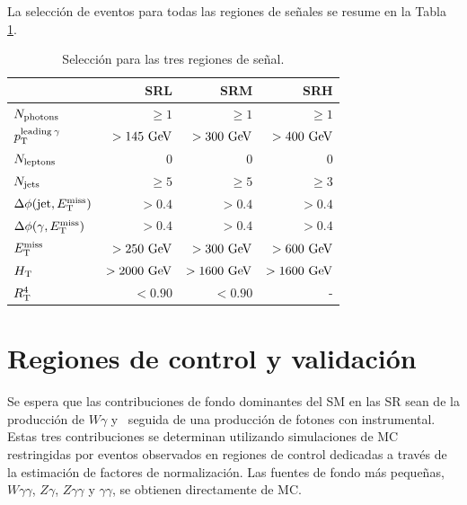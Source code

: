 La selección de eventos para todas las regiones de señales se resume en la Tabla \ref{tab:sr_selection}. 

\begin{table}[ht!]
  \centering
  \begin{tabular}{lrrr}
    \hline
    \hline
                                                    &        SRL    &       SRM     &         SRH \\
      \hline
      $N_{\text{photons}}$                        &        $\ge1$ &        $\ge1$ &        $\ge1$ \\
      $p_{\text{T}}^{\text{leading}\: \gamma}$                 &  $>145\ \gev$ &  $>300\ \gev$ &  $>400\ \gev$ \\
      $N_{\text{leptons}}$                        &             0 &             0 &             0 \\
      $N_{\text{jets}}$                           &       $\ge 5$ &       $\ge 5$ &       $\ge 3$ \\
      $\Delta\phi(\text{jet}, E_{\text{T}}^{\text{miss}})$                &        $>0.4$ &        $>0.4$ &        $>0.4$ \\
      $\Delta\phi(\gamma, E_{\text{T}}^{\text{miss}})$                    &        $>0.4$ &        $>0.4$ &        $>0.4$ \\
      $E_{\text{T}}^{\text{miss}}$                                       &  $>250\ \gev$ &  $>300\ \gev$ &  $>600\ \gev$ \\
      $H_{\text{T}}$                                         & $>2000\ \gev$ & $>1600\ \gev$ & $>1600\ \gev$ \\
      $R_{\text{T}}^{4}$                            &       $<0.90$ &       $<0.90$ &             - \\
      \hline
      \hline
    \end{tabular}
  \caption{Selección para las tres regiones de señal.}
  \label{tab:sr_selection}
\end{table}



\section{Regiones de control y validación}

Se espera que las contribuciones de fondo dominantes del SM en las SR sean de la
producción de $W \gamma$ y \ttbarph\, seguida de una producción de fotones con \met instrumental. Estas tres contribuciones se determinan utilizando simulaciones de MC restringidas por eventos observados en regiones de control dedicadas a través de la estimación de factores de normalización. Las fuentes de fondo más pequeñas,
$ W \gamma \gamma $, $ Z \gamma $, $ Z \gamma \gamma $ y $ \gamma \gamma $, se obtienen
directamente de MC.

